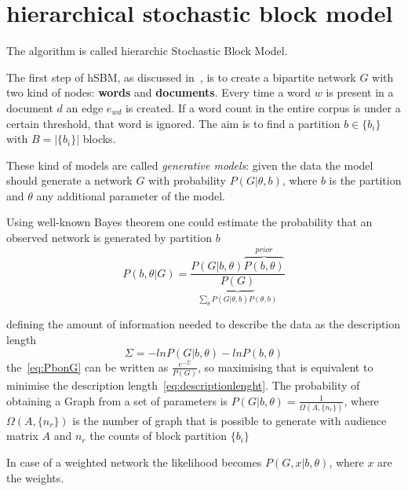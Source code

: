 \appendix
{}
\chapter{hierarchical stochastic block model}\label{app:hsbm}
The algorithm is called hierarchic Stochastic Block Model.

The first step of hSBM, as discussed in~\cite{peixoto2014efficient},
is to create a bipartite network $G$ with two kind of nodes: \textbf{words} and \textbf{documents}.
Every time a word $w$ is present in a document $d$ an edge $e_{wd}$ is created.
If a word count in the entire corpus is under a certain threshold, that word is ignored.
The aim is to find a partition $b\in\{b_i\}$ with $B=\left|\{b_i\}\right|$ blocks.

These kind of models are called \textit{generative models}: given the data the model
should generate a network $G$ with probability $P(G|\theta, b)$, where $b$ is
the partition and $\theta$ any additional parameter of the model.

Using well-known Bayes theorem one could estimate the probability that an
observed network is generated by partition $b$
\begin{equation}\label{eq:PbonG}
  P(b,\theta|G)=\frac{P(G|b,\theta)\overbrace{P(b,\theta)}^{prior}}{\underbrace{P(G)}_{\sum_{\theta}P(G|\theta, b)P(\theta, b)}}
\end{equation}

defining the amount of information needed to describe the data as the description length
\begin{equation}\label{eq:descriptionlenght}
  \Sigma=-lnP(G|b,\theta)-lnP(b, \theta)
\end{equation}
the~\ref{eq:PbonG} can be written as $\frac{e^{-\Sigma}}{P(G)}$, so maximising that is equivalent to minimise the description length~\ref{eq:descriptionlenght}. The probability of obtaining a Graph from a set of parameters is $P(G|b,\theta)=\frac{1}{\Omega(A,\{n_r\})}$, where $\Omega(A,\{n_r\})$ is the number of graph that is possible to generate with audience matrix $A$ and $n_r$ the counts of block partition $\{b_i\}$

In case of a weighted network the likelihood becomes $P(G,x|b,\theta)$, where $x$
are the weights.

